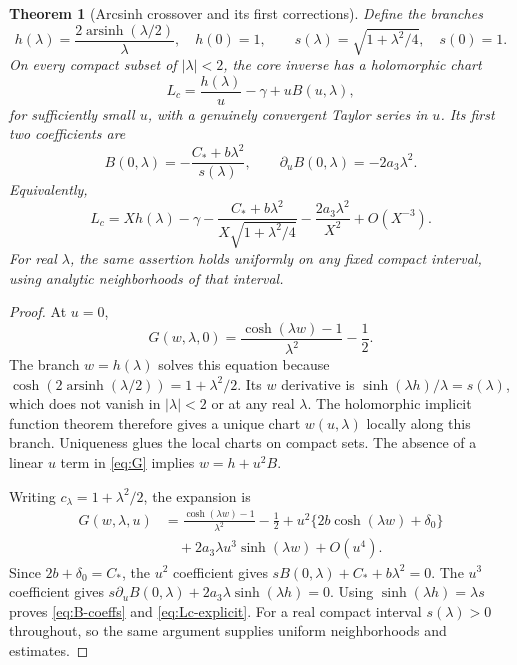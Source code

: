 \documentclass[11pt,a4paper]{article}
\numberwithin{equation}{section}
\newtheorem{theorem}{Theorem}[section]
\theoremstyle{definition}\newtheorem{definition}[theorem]{Definition}
\theoremstyle{remark}\newtheorem{remark}[theorem]{Remark}
\newcommand{\arsinh}{\operatorname{arsinh}}
\begin{document}
\begin{theorem}[Arcsinh crossover and its first corrections]
\label{thm:crossover}
Define the branches
\begin{equation}\label{eq:hs}
 h(\lambda)=\frac{2\arsinh(\lambda/2)}{\lambda},\quad h(0)=1,
 \qquad s(\lambda)=\sqrt{1+\lambda^2/4},\quad s(0)=1.
\end{equation}
On every compact subset of $|\lambda|<2$, the core inverse has a
holomorphic chart
\begin{equation}\label{eq:core-chart}
 L_c=\frac{h(\lambda)}u-\gamma+uB(u,\lambda),
\end{equation}
for sufficiently small $u$, with a genuinely convergent Taylor series
in $u$. Its first two coefficients are
\begin{equation}\label{eq:B-coeffs}
 B(0,\lambda)=-\frac{C_*+b\lambda^2}{s(\lambda)},
 \qquad \partial_uB(0,\lambda)=-2a_3\lambda^2.
\end{equation}
Equivalently,
\begin{equation}\label{eq:Lc-explicit}
 L_c=Xh(\lambda)-\gamma-
 \frac{C_*+b\lambda^2}{X\sqrt{1+\lambda^2/4}}
 -\frac{2a_3\lambda^2}{X^2}+O(X^{-3}).
\end{equation}
For real $\lambda$, the same assertion holds uniformly on any fixed
compact interval, using analytic neighborhoods of that interval.
\end{theorem}
\begin{proof}
At $u=0$,
\[
 G(w,\lambda,0)=\frac{\cosh(\lambda w)-1}{\lambda^2}-\frac12.
\]
The branch $w=h(\lambda)$ solves this equation because
$\cosh(2\arsinh(\lambda/2))=1+\lambda^2/2$.
Its $w$ derivative is
$\sinh(\lambda h)/\lambda=s(\lambda)$, which does not vanish
in $|\lambda|<2$ or at any real $\lambda$.
The holomorphic implicit function theorem therefore gives a unique
chart $w(u,\lambda)$ locally along this branch. Uniqueness glues the
local charts on compact sets. The absence of a linear $u$ term in
\eqref{eq:G} implies $w=h+u^2B$.

Writing $c_\lambda=1+\lambda^2/2$, the expansion is
\begin{align*}
 G(w,\lambda,u)
 &=\frac{\cosh(\lambda w)-1}{\lambda^2}-\frac12
   +u^2\{2b\cosh(\lambda w)+\delta_0\}\\
 &\quad+2a_3\lambda u^3\sinh(\lambda w)+O(u^4).
\end{align*}
Since $2b+\delta_0=C_*$, the $u^2$ coefficient gives
$sB(0,\lambda)+C_*+b\lambda^2=0$.
The $u^3$ coefficient gives
$s\partial_uB(0,\lambda)+2a_3\lambda\sinh(\lambda h)=0$.
Using $\sinh(\lambda h)=\lambda s$ proves
\eqref{eq:B-coeffs} and \eqref{eq:Lc-explicit}.
For a real compact interval $s(\lambda)>0$ throughout, so the same
argument supplies uniform neighborhoods and estimates.
\end{proof}
\end{document}
